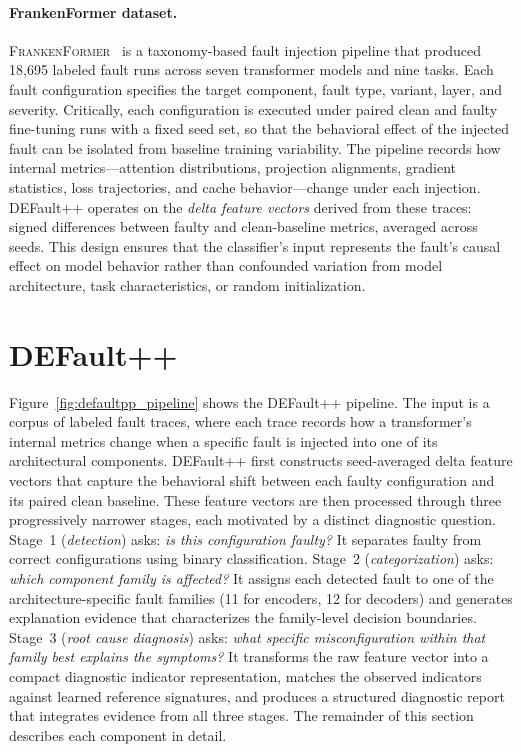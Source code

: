 \paragraph{FrankenFormer dataset.}
\textsc{FrankenFormer}~\cite{frankenformer} is a taxonomy-based fault injection pipeline that produced 18{,}695 labeled fault runs across seven transformer models and nine tasks. Each fault configuration specifies the target component, fault type, variant, layer, and severity. Critically, each configuration is executed under paired clean and faulty fine-tuning runs with a fixed seed set, so that the behavioral effect of the injected fault can be isolated from baseline training variability. The pipeline records how internal metrics---attention distributions, projection alignments, gradient statistics, loss trajectories, and cache behavior---change under each injection. DEFault++ operates on the \emph{delta feature vectors} derived from these traces: signed differences between faulty and clean-baseline metrics, averaged across seeds. This design ensures that the classifier's input represents the fault's causal effect on model behavior rather than confounded variation from model architecture, task characteristics, or random initialization.

\section{DEFault++}
\label{sec:defaultpp_approach}

Figure~\ref{fig:defaultpp_pipeline} shows the DEFault++ pipeline. The input is a corpus of labeled fault traces, where each trace records how a transformer's internal metrics change when a specific fault is injected into one of its architectural components. DEFault++ first constructs seed-averaged delta feature vectors that capture the behavioral shift between each faulty configuration and its paired clean baseline. These feature vectors are then processed through three progressively narrower stages, each motivated by a distinct diagnostic question. Stage~1 (\emph{detection}) asks: \emph{is this configuration faulty?} It separates faulty from correct configurations using binary classification. Stage~2 (\emph{categorization}) asks: \emph{which component family is affected?} It assigns each detected fault to one of the architecture-specific fault families (11 for encoders, 12 for decoders) and generates explanation evidence that characterizes the family-level decision boundaries. Stage~3 (\emph{root cause diagnosis}) asks: \emph{what specific misconfiguration within that family best explains the symptoms?} It transforms the raw feature vector into a compact diagnostic indicator representation, matches the observed indicators against learned reference signatures, and produces a structured diagnostic report that integrates evidence from all three stages. The remainder of this section describes each component in detail.

